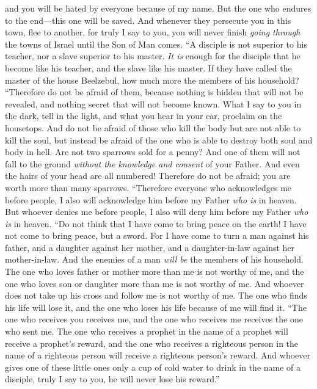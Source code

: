 \begin{biblechapter}
\verse and you will be hated by everyone because of my name. But the one who endures to the end—this one will be saved.
\verse And whenever they persecute you in this town, flee to another, for truly I say to you, you will never finish \textit{going through} the towns of Israel until the Son of Man comes.
\verse “A disciple is not superior to his teacher, nor a slave superior to his master.
\verse \textit{It is} enough for the disciple that he become like his teacher, and the slave like his master. If they have called the master of the house Beelzebul, how much more the members of his household?
 “Therefore do not be afraid of them, because nothing is hidden that will not be revealed, and nothing secret that will not become known.
\verse What I say to you in the dark, tell in the light, and what you hear in your ear, proclaim on the housetops.
\verse And do not be afraid of those who kill the body but are not able to kill the soul, but instead be afraid of the one who is able to destroy both soul and body in hell.
\verse Are not two sparrows sold for a penny? And one of them will not fall to the ground \textit{without the knowledge and consent} of your Father.
\verse And even the hairs of your head are all numbered!
\verse Therefore do not be afraid; you are worth more than many sparrows.
\verse “Therefore everyone who acknowledges me before people, I also will acknowledge him before my Father \textit{who is} in heaven.
\verse But whoever denies me before people, I also will deny him before my Father \textit{who is} in heaven.
 “Do not think that I have come to bring peace on the earth! I have not come to bring peace, but a sword.
\verse For I have come to turn a man against his father, and a daughter against her mother, and a daughter-in-law against her mother-in-law.
\verse And the enemies of a man \textit{will be} the members of his household.
\verse The one who loves father or mother more than me is not worthy of me, and the one who loves son or daughter more than me is not worthy of me.
\verse And whoever does not take up his cross and follow me is not worthy of me.
\verse The one who finds his life will lose it, and the one who loses his life because of me will find it.
 “The one who receives you receives me, and the one who receives me receives the one who sent me.
\verse The one who receives a prophet in the name of a prophet will receive a prophet’s reward, and the one who receives a righteous person in the name of a righteous person will receive a righteous person’s reward.
\verse And whoever gives one of these little ones only a cup of cold water to drink in the name of a disciple, truly I say to you, he will never lose his reward.”
\end{biblechapter}

